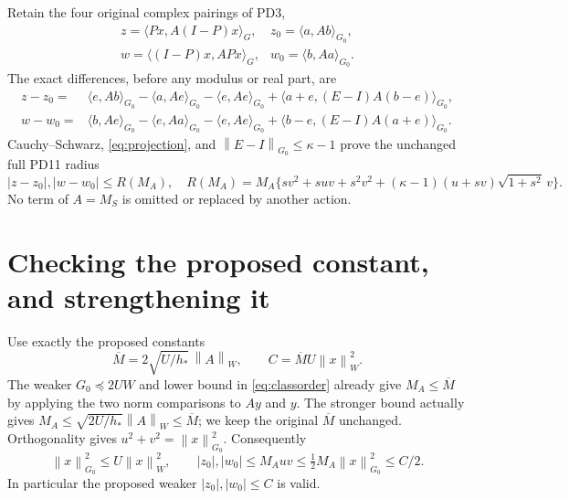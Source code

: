 \documentclass[11pt]{article}
\newcommand{\norm}[1]{\left\lVert#1\right\rVert}
\begin{document}
Retain the four original complex pairings of PD3,
\begin{equation}\tag{MC9}\label{eq:pairings}
 \begin{array}{ll}
 z=\langle Px,A(I-P)x\rangle_G,&z_0=\langle a,Ab\rangle_{G_0},\\
 w=\langle(I-P)x,APx\rangle_G,&w_0=\langle b,Aa\rangle_{G_0}.
 \end{array}
\end{equation}
The exact differences, before any modulus or real part, are
\[
\begin{split}
 z-z_0={}&\langle e,Ab\rangle_{G_0}-\langle a,Ae\rangle_{G_0}
          -\langle e,Ae\rangle_{G_0}
          +\langle a+e,(E-I)A(b-e)\rangle_{G_0},\\
 w-w_0={}&\langle b,Ae\rangle_{G_0}-\langle e,Aa\rangle_{G_0}
          -\langle e,Ae\rangle_{G_0}
          +\langle b-e,(E-I)A(a+e)\rangle_{G_0}.
\end{split}
\]
Cauchy--Schwarz, \eqref{eq:projection}, and
$\norm{E-I}_{G_0}\le\kappa-1$ prove the unchanged full PD11
radius
\begin{equation}\tag{MC10}\label{eq:radius}
 |z-z_0|,|w-w_0|\le R(M_A),\quad
 R(M_A)=M_A\{sv^2+suv+s^2v^2
              +(\kappa-1)(u+sv)\sqrt{1+s^2}\,v\}.
\end{equation}
No term of $A=M_S$ is omitted or replaced by another action.

\section{Checking the proposed constant, and strengthening it}

Use exactly the proposed constants
\begin{equation}\tag{MC11}\label{eq:C}
 \overline M=2\sqrt{U/h_*}\,\norm{A}_W,\qquad
 C=\overline M U\norm{x}_W^2.
\end{equation}
The weaker $G_0\preceq2UW$ and lower bound in
\eqref{eq:classorder} already give $M_A\le\overline M$ by
applying the two norm comparisons to $Ay$ and $y$.
The stronger bound actually gives
$M_A\le\sqrt{2U/h_*}\norm{A}_W\le\overline M$; we keep
the original $\overline M$ unchanged. Orthogonality gives
$u^2+v^2=\norm{x}_{G_0}^2$. Consequently
\begin{equation}\tag{MC12}\label{eq:center}
 \norm{x}_{G_0}^2\le U\norm{x}_W^2,
 \qquad |z_0|,|w_0|\le M_Auv
                \le\tfrac12M_A\norm{x}_{G_0}^2\le C/2.
\end{equation}
In particular the proposed weaker $|z_0|,|w_0|\le C$ is valid.
\end{document}
